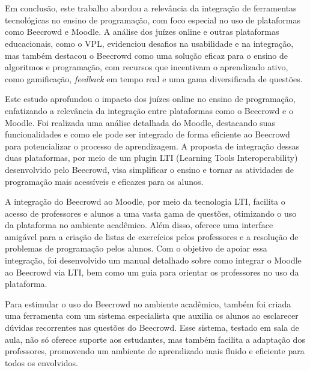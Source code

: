 

\chapter{}

Em conclusão, este trabalho abordou a relevância da integração de ferramentas tecnológicas no ensino de programação, com foco especial no uso de plataformas como Beecrowd e Moodle. A análise dos juízes online e outras plataformas educacionais, como o VPL, evidenciou desafios na usabilidade e na integração, mas também destacou o Beecrowd como uma solução eficaz para o ensino de algoritmos e programação, com recursos que incentivam o aprendizado ativo, como gamificação, \textit{feedback} em tempo real e uma gama diversificada de questões.

Este estudo aprofundou o impacto dos juízes online no ensino de programação, enfatizando a relevância da integração entre plataformas como o Beecrowd e o Moodle. Foi realizada uma análise detalhada do Moodle, destacando suas funcionalidades e como ele pode ser integrado de forma eficiente ao Beecrowd para potencializar o processo de aprendizagem. A proposta de integração dessas duas plataformas, por meio de um plugin LTI (Learning Tools Interoperability) desenvolvido pelo Beecrowd, visa simplificar o ensino e tornar as atividades de programação mais acessíveis e eficazes para os alunos.

A integração do Beecrowd ao Moodle, por meio da tecnologia LTI, facilita o acesso de professores e alunos a uma vasta gama de questões, otimizando o uso da plataforma no ambiente acadêmico. Além disso, oferece uma interface amigável para a criação de listas de exercícios pelos professores e a resolução de problemas de programação pelos alunos. Com o objetivo de apoiar essa integração, foi desenvolvido um manual detalhado sobre como integrar o Moodle ao Beecrowd via LTI, bem como um guia para orientar os professores no uso da plataforma.

Para estimular o uso do Beecrowd no ambiente acadêmico, também foi criada uma ferramenta com um sistema especialista que auxilia os alunos ao esclarecer dúvidas recorrentes nas questões do Beecrowd. Esse sistema, testado em sala de aula, não só oferece suporte aos estudantes, mas também facilita a adaptação dos professores, promovendo um ambiente de aprendizado mais fluido e eficiente para todos os envolvidos.

